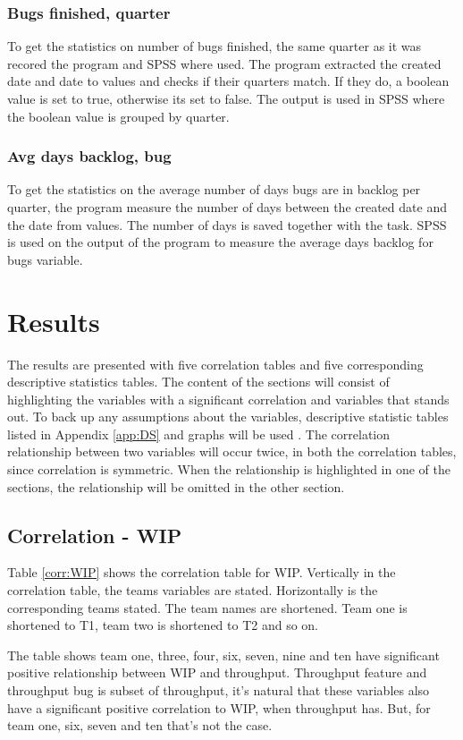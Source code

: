 \documentclass[UKenglish]{ifimaster}  %
\begin{document}
\subsection{Bugs finished, quarter}
To get the statistics on number of bugs finished, the same quarter as it was recored the program and SPSS where used. The program extracted the created date and date to values and checks if their quarters match. If they do, a boolean value is set to true, otherwise its set to false. The output is used in SPSS where the boolean value is grouped by quarter. 
\subsection{Avg days backlog, bug}
To get the statistics on the average number of days bugs are in backlog per quarter, the program measure the number of days between the created date and the date from values. The number of days is saved together with the task. SPSS is used on the output of the program to measure the average days backlog for bugs variable.



\chapter{Results}                     
\label{ch:res}
The results are presented with five correlation tables and five corresponding descriptive statistics tables.
The content of the sections will consist of highlighting the variables with a significant correlation and variables that stands out. To back up any assumptions about the variables, descriptive statistic tables listed in Appendix \ref{app:DS} and graphs will be used . The correlation relationship between two variables will occur twice, in both the correlation tables, since correlation is symmetric. When the relationship is highlighted in one of the sections, the relationship will be omitted in the other section. 

 
\section{Correlation - WIP}
\label{sec:corr:WIP}
Table \ref{corr:WIP} shows the correlation table for WIP. Vertically in the correlation table, the teams variables are stated. Horizontally is the corresponding teams stated. The team names are shortened. Team one is shortened to T1, team two is shortened to T2 and so on.

The table shows team one, three, four, six, seven, nine and ten have significant positive relationship between WIP and throughput. Throughput feature and throughput bug is subset of throughput, it's natural that these variables also have a significant positive correlation to WIP, when throughput has. But, for team one, six, seven and ten that's not the case. 
\end{document}
